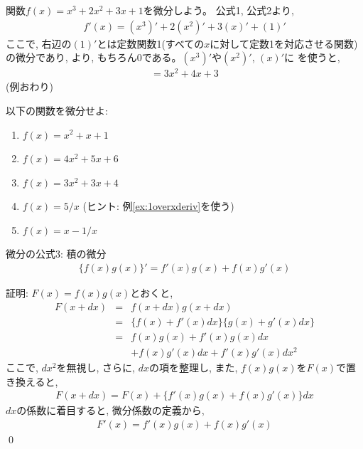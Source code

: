 \begin{exmpl} 関数$f(x)=x^3+2x^2+3x+1$を微分しよう。
公式1, 公式2より, 
\begin{eqnarray}f'(x)=(x^3)'+2(x^2)'+3(x)'+(1)'\end{eqnarray}
ここで, 右辺の$(1)'$とは定数関数1(すべての$x$に対して定数1を対応させる関数)の微分であり, 
より, もちろん0である。$(x^3)'$や$(x^2)'$, $(x)'$に
を使うと, 
\begin{eqnarray}=3x^2+4x+3\end{eqnarray}
(例おわり)\end{exmpl}
\hv


\begin{q}\label{q:diff_func0} 以下の関数を微分せよ:
\begin{enumerate}
\item $f(x)=x^2+x+1$
\item $f(x)=4x^2+5x+6$
\item $f(x)=3x^2+3x+4$
\item $f(x)=5/x$ (ヒント: 例\ref{ex:1overxderiv}を使う)
\item $f(x)=x-1/x$
\end{enumerate}\end{q}
\hv

\begin{itembox}{微分の公式3: 積の微分}
\begin{eqnarray}
\{f(x)g(x)\}'=f'(x)g(x)+f(x)g'(x)\label{eq:diff_form3}
\end{eqnarray}
\end{itembox}

証明: $F(x)=f(x)g(x)$とおくと, 
\begin{eqnarray*}
F(x+dx) & = & f(x+dx)g(x+dx)\\
               & = & \{f(x)+f'(x)dx\}\{g(x)+g'(x)dx\}\\
               & = & f(x)g(x)+f'(x)g(x)dx\\
               &   & +f(x)g'(x)dx+f'(x)g'(x)dx^2
\end{eqnarray*}
ここで, $dx^2$を無視し, さらに, $dx$の項を整理し, また, $f(x)g(x)$を$F(x)$で置き換えると, 
\begin{eqnarray*}F(x+dx)= F(x)+\{f'(x)g(x)+f(x)g'(x)\}dx\end{eqnarray*}
$dx$の係数に着目すると, 微分係数の定義から, 
\begin{eqnarray}F'(x)=f'(x)g(x)+f(x)g'(x)\end{eqnarray}
\qed
\hv

